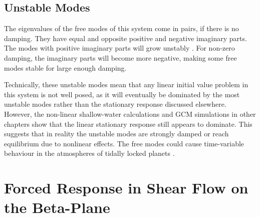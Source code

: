 
%

\subsection{Unstable Modes}

 The eigenvalues of the free modes of this system come in pairs, if there is no damping. They have equal and opposite positive and negative imaginary parts. The modes with positive imaginary parts will grow unstably \citep{wang2014instability, ribstein2014instability}. For non-zero damping, the imaginary parts will become more negative, making some free modes stable for large enough damping.

Technically, these unstable modes mean that any linear initial value problem in this system is not well posed, as it will eventually be dominated by the most unstable modes rather than the stationary response discussed elsewhere. However, the non-linear shallow-water calculations and GCM simulations in other chapters show that the linear stationary response still appears to dominate. This suggests that in reality the unstable modes are strongly damped or reach equilibrium due to nonlinear effects. The free modes could cause time-variable behaviour in the atmospheres of tidally locked planets \citep{armstrong2017variability,pierrehumbert2018review}.


\section{Forced Response in Shear Flow on the Beta-Plane}\label{sec:shear-flow-beta-plane}


